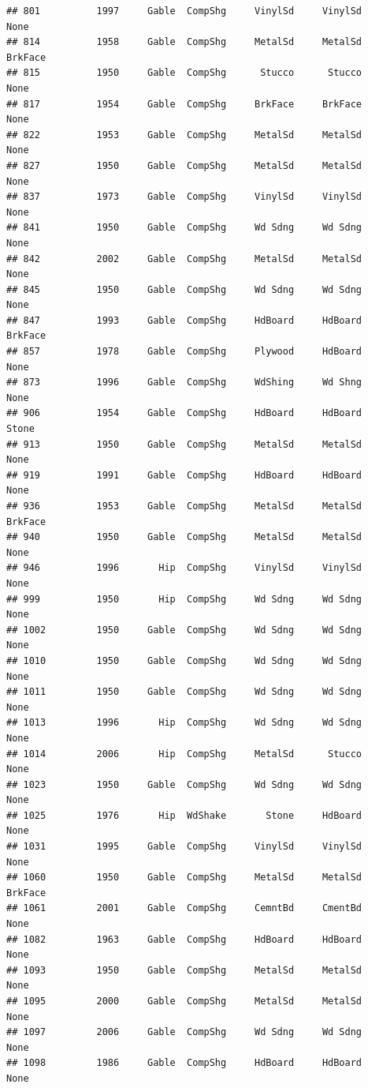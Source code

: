 \documentclass[]{article}
\begin{document}
\begin{verbatim}
## 801          1997     Gable  CompShg     VinylSd     VinylSd       None
## 814          1958     Gable  CompShg     MetalSd     MetalSd    BrkFace
## 815          1950     Gable  CompShg      Stucco      Stucco       None
## 817          1954     Gable  CompShg     BrkFace     BrkFace       None
## 822          1953     Gable  CompShg     MetalSd     MetalSd       None
## 827          1950     Gable  CompShg     MetalSd     MetalSd       None
## 837          1973     Gable  CompShg     VinylSd     VinylSd       None
## 841          1950     Gable  CompShg     Wd Sdng     Wd Sdng       None
## 842          2002     Gable  CompShg     MetalSd     MetalSd       None
## 845          1950     Gable  CompShg     Wd Sdng     Wd Sdng       None
## 847          1993     Gable  CompShg     HdBoard     HdBoard    BrkFace
## 857          1978     Gable  CompShg     Plywood     HdBoard       None
## 873          1996     Gable  CompShg     WdShing     Wd Shng       None
## 906          1954     Gable  CompShg     HdBoard     HdBoard      Stone
## 913          1950     Gable  CompShg     MetalSd     MetalSd       None
## 919          1991     Gable  CompShg     HdBoard     HdBoard       None
## 936          1953     Gable  CompShg     MetalSd     MetalSd    BrkFace
## 940          1950     Gable  CompShg     MetalSd     MetalSd       None
## 946          1996       Hip  CompShg     VinylSd     VinylSd       None
## 999          1950       Hip  CompShg     Wd Sdng     Wd Sdng       None
## 1002         1950     Gable  CompShg     Wd Sdng     Wd Sdng       None
## 1010         1950     Gable  CompShg     Wd Sdng     Wd Sdng       None
## 1011         1950     Gable  CompShg     Wd Sdng     Wd Sdng       None
## 1013         1996       Hip  CompShg     Wd Sdng     Wd Sdng       None
## 1014         2006       Hip  CompShg     MetalSd      Stucco       None
## 1023         1950     Gable  CompShg     Wd Sdng     Wd Sdng       None
## 1025         1976       Hip  WdShake       Stone     HdBoard       None
## 1031         1995     Gable  CompShg     VinylSd     VinylSd       None
## 1060         1950     Gable  CompShg     MetalSd     MetalSd    BrkFace
## 1061         2001     Gable  CompShg     CemntBd     CmentBd       None
## 1082         1963     Gable  CompShg     HdBoard     HdBoard       None
## 1093         1950     Gable  CompShg     MetalSd     MetalSd       None
## 1095         2000     Gable  CompShg     MetalSd     MetalSd       None
## 1097         2006     Gable  CompShg     Wd Sdng     Wd Sdng       None
## 1098         1986     Gable  CompShg     HdBoard     HdBoard       None

\end{verbatim}
\end{document}
